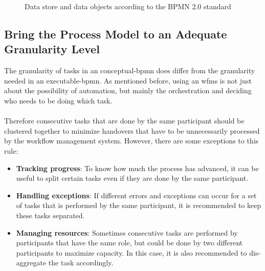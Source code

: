 \begin{figure}[H]
\begin{subfigure}[b]{0.18\columnwidth}
		\label{fig:dataobject}
	\end{subfigure}
	\caption{Data store and data objects according to the BPMN 2.0 standard \cite{bpmnstandard}} %
	\label{fig:datastoreandobject} %
\end{figure}

\subsection{Bring the Process Model to an Adequate Granularity Level}\label{granulartity}
The granularity of tasks in an \gls{conceptual-bpmn} does differ from the granularity needed in an \gls{executable-bpmn}.
As mentioned before, using an \gls{wfms} is not just about the possibility of automation, but mainly the orchestration and deciding who needs to be doing which task. \cite{freund2019real}
\\~\\Therefore consecutive tasks that are done by the same participant should be clustered together to minimize handovers that have to be unnecessarily processed by the workflow management system. \cite{fundamentals}
However, there are some exceptions to this rule:
\begin{itemize}
	\item \textbf{Tracking progress}: To know how much the process has advanced, it can be useful to split certain tasks even if they are done by the same participant. 
	\item \textbf{Handling exceptions}: If different errors and exceptions can occur for a set of tasks that is performed by the same participant, it is recommended to keep these tasks separated.
	\item \textbf{Managing resources}: Sometimes consecutive tasks are performed by participants that have the same role, but could be done by two different participants to maximize capacity. In this case, it is also recommended to dis-aggregate the task accordingly.
\end{itemize}

